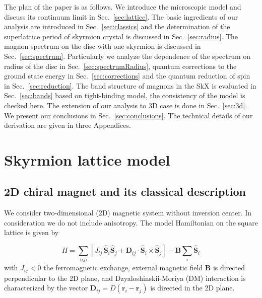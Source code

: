 \documentclass[aps,prb,twocolumn,superscriptaddress,nobalancelastpage]{revtex4-1}
\begin{document}
The plan of the paper is as follows. We introduce the microscopic model and discuss its continuum limit in Sec.\ \ref{sec:lattice}. The basic ingredients of our analysis are introduced in Sec.\ \ref{sec:classics} and the determination of the superlattice period of skyrmion crystal is discussed in Sec.\ \ref{sec:radius}. The magnon spectrum on the disc with one skyrmion is discussed in Sec.\ \ref{sec:spectrum}. Particularly we analyze the dependence of the spectrum on radius of the disc  in Sec.\ \ref{sec:spectrumRadius},  quantum corrections to the ground state energy in Sec.\ \ref{sec:corrections} and  the quantum reduction of spin in Sec.\ \ref{sec:reduction}. The band structure of magnons in the SkX is evaluated in Sec.\ \ref{sec:bands} based on tight-binding model, the consistency of the model is checked here. The extension of our analysis to 3D case is done in Sec.\ \ref{sec:3d}. We present our conclusions in Sec.\ \ref{sec:conclusions}. The technical details of our derivation are given in three Appendices. 

\section{Skyrmion lattice model 
\label{sec:lattice}}

\subsection{2D chiral magnet and its classical description 
\label{sec:classics}}

We consider two-dimensional (2D) magnetic system without inversion center. In consideration we do not include anisotropy. \cite{Wilson2014} The model Hamiltonian on the square lattice is given by

\begin{equation}
\label{eq:ham}	
H = \sum\limits_{\langle ij\rangle} 
\left[ J_{ij} \, 
\widehat{\mathbf{S}}_{ i}\widehat{\mathbf{S}}_{ j}
 + \mathbf{D}_{ij} \cdot 
 \widehat {\mathbf{S}}_{i} \times \widehat {\mathbf{S}}_{ j} \right] - {\mathbf{B}} \sum\limits_{i }  \widehat{\mathbf{S}}_ {i}
\end{equation}
with $J_{ij} <0$ the ferromagnetic exchange, external magnetic field $\mathbf{B}$ is directed perpendicular to the 2D plane, and Dzyaloshinskii-Moriya (DM) interaction is characterized by the vector $\mathbf{D}_{ij} = D \left(\mathbf{r}_i - \mathbf{r}_j \right)$ is directed in the 2D plane.  \cite{Crepieux1998, Elhajal2002}
\end{document}
